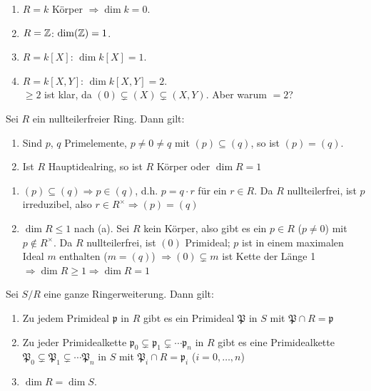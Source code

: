 \documentclass[a4paper, 10pt]{report}
\begin{document}
\begin{nnBsp}
\begin{enumerate}
\item $R=k$ K\"orper $\Rightarrow \dim{k}=0$.
\item $R=\mathbb{Z}$: $\dim{\ZZ}=1$.
\item $R=k[X]$: $\dim{k[X]} =1$.
\item $R=k[X,Y]$: $\dim{k[X,Y]} =2$.\\
$\geq 2$ ist klar, da $(0)\subsetneq(X)\subsetneq(X,Y)$. Aber warum $=2$?
\end{enumerate}
\end{nnBsp}

\begin{Bem}
\label{2.25}
Sei $R$ ein nullteilerfreier Ring. Dann gilt: 
\begin{enumerate}
\item Sind $p$, $q$ Primelemente, $p\neq 0\neq q$ mit $(p)\subseteq (q)$, so ist
$(p)=(q)$.
\item Ist $R$ Hauptidealring, so ist $R$ K\"orper oder $\dim{R}=1$
\end{enumerate}
\end{Bem}
\begin{Bew}
\begin{enumerate}

\item $(p)\subseteq (q)\Rightarrow p\in(q)$, d.h. $p=q\cdot r$ f\"ur ein $r\in R$.
Da $R$ nullteilerfrei, ist $p$ irreduzibel, also $r\in R^{\times}\Rightarrow (p)=(q)$

\item $\dim{R}\leq 1$ nach (a). Sei $R$ kein K\"orper, also gibt es ein $p\in R$ 
($p\neq 0$) mit $p\notin R^{\times}$. Da $R$ nullteilerfrei, ist $(0)$ Primideal;
$p$ ist in einem maximalen Ideal $m$ enthalten ($m=(q)$)
$\Rightarrow (0)\subsetneq m$ ist Kette der L\"ange 1
$\Rightarrow \dim{R}\geq 1 \Rightarrow \dim{R}=1$

\end{enumerate}
\end{Bew}

\begin{Satz}
\label{Satz10}
Sei $S/R$ eine ganze Ringerweiterung. Dann gilt:
\begin{enumerate}

\item Zu jedem Primideal $\mathfrak{p}$ in $R$ gibt es ein Primideal $\mathfrak{P}$ in $S$
mit $\mathfrak{P}\cap R=\mathfrak{p}$

\item Zu jeder Primidealkette $\mathfrak{p}_0\subsetneq \mathfrak{p}_1\subsetneq \cdots
\mathfrak{p}_n$ in $R$ gibt es eine Primidealkette 
$\mathfrak{P}_0\subsetneq \mathfrak{P}_1\subsetneq \cdots \mathfrak{P}_n$ in $S$
mit $\mathfrak{P}_i\cap R=\mathfrak{p}_i$ ($i=0,\ldots, n$)

\item \label{Satz10c}$\dim{R}= \dim{S}$.

\end{enumerate}
\end{Satz}
\end{document}
